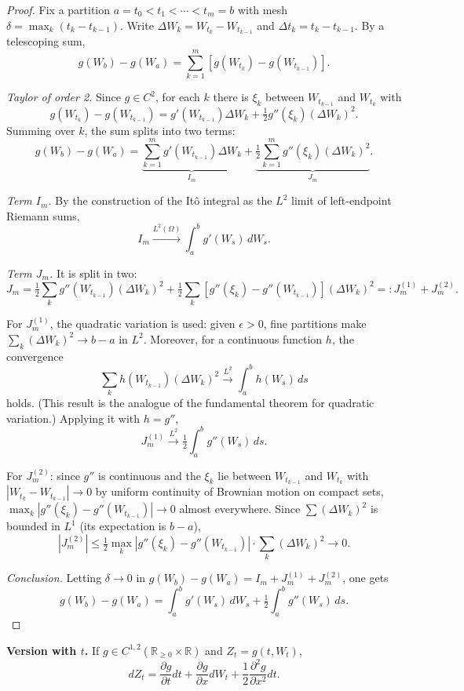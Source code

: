 \documentclass[11pt, a4paper]{article}
\begin{document}
\begin{proof}
Fix a partition $a = t_0 < t_1 < \cdots < t_m = b$ with mesh $\delta = \max_k (t_k -
t_{k-1})$. Write $\Delta W_k = W_{t_k} - W_{t_{k-1}}$ and $\Delta t_k = t_k - t_{k-1}$.
By a telescoping sum,
$$ g(W_b) - g(W_a) = \sum_{k=1}^m [g(W_{t_k}) - g(W_{t_{k-1}})]. $$

\textit{Taylor of order 2.} Since $g \in C^2$, for each $k$ there is $\xi_k$ between $W_{t_{k-1}}$ and
$W_{t_k}$ with
$$ g(W_{t_k}) - g(W_{t_{k-1}}) = g'(W_{t_{k-1}}) \Delta W_k + \tfrac{1}{2} g''(\xi_k) (\Delta
W_k)^2. $$
Summing over $k$, the sum splits into two terms:
$$ g(W_b) - g(W_a) = \underbrace{\sum_{k=1}^m g'(W_{t_{k-1}}) \Delta W_k}_{I_m} +
\underbrace{\tfrac{1}{2} \sum_{k=1}^m g''(\xi_k) (\Delta W_k)^2}_{J_m}. $$

\textit{Term $I_m$.} By the construction of the Itô integral as the $L^2$ limit of
left-endpoint Riemann sums,
$$ I_m \xrightarrow{L^2(\Omega)}{} \int_a^b g'(W_s) \, dW_s. $$

\textit{Term $J_m$.} It is split in two:
$$ J_m = \tfrac{1}{2} \sum_k g''(W_{t_{k-1}}) (\Delta W_k)^2 + \tfrac{1}{2} \sum_k [g''(\xi_k) -
g''(W_{t_{k-1}})] (\Delta W_k)^2 =: J_m^{(1)} + J_m^{(2)}. $$

For $J_m^{(1)}$, the quadratic variation is used: given $\epsilon > 0$, fine partitions make
$\sum_k (\Delta W_k)^2 \to b - a$ in $L^2$. Moreover, for a continuous function
$h$, the convergence
$$ \sum_k h(W_{t_{k-1}}) (\Delta W_k)^2 \xrightarrow{L^2}{} \int_a^b h(W_s) \, ds $$
holds. (This result is the analogue of the fundamental theorem for quadratic variation.)
Applying it with $h = g''$,
$$ J_m^{(1)} \xrightarrow{L^2}{} \tfrac{1}{2} \int_a^b g''(W_s) \, ds. $$

For $J_m^{(2)}$: since $g''$ is continuous and the $\xi_k$ lie between $W_{t_{k-1}}$ and $W_{t_k}$ with
$|W_{t_k} - W_{t_{k-1}}| \to 0$ by uniform continuity of Brownian motion on compact sets,
$\max_k |g''(\xi_k) - g''(W_{t_{k-1}})| \to 0$ almost everywhere. Since $\sum (\Delta W_k)^2$ is
bounded in $L^1$ (its expectation is $b - a$),
$$ |J_m^{(2)}| \le \tfrac{1}{2} \max_k |g''(\xi_k) - g''(W_{t_{k-1}})| \cdot \sum_k (\Delta W_k)^2
\xrightarrow{}{} 0. $$

\textit{Conclusion.} Letting $\delta \to 0$ in
$g(W_b) - g(W_a) = I_m + J_m^{(1)} + J_m^{(2)}$, one gets
$$ g(W_b) - g(W_a) = \int_a^b g'(W_s) \, dW_s + \tfrac{1}{2} \int_a^b g''(W_s) \, ds. $$
\end{proof}

\textbf{Version with $t$.} If $g \in C^{1, 2}(\mathbb{R}_{\ge 0} \times \mathbb{R})$ and
$Z_t = g(t, W_t)$,
$$ dZ_t = \frac{\partial g}{\partial t} dt + \frac{\partial g}{\partial x} dW_t + \frac{1}{2}
\frac{\partial^2 g}{\partial x^2} dt. $$
\end{document}

